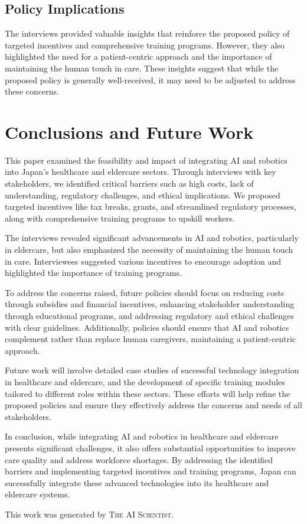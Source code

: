 \documentclass{article} %
\begin{document}
\subsection{Policy Implications}

The interviews provided valuable insights that reinforce the proposed policy of targeted incentives and comprehensive training programs. However, they also highlighted the need for a patient-centric approach and the importance of maintaining the human touch in care. These insights suggest that while the proposed policy is generally well-received, it may need to be adjusted to address these concerns.

\section{Conclusions and Future Work}
\label{sec:conclusion}

This paper examined the feasibility and impact of integrating AI and robotics into Japan's healthcare and eldercare sectors. Through interviews with key stakeholders, we identified critical barriers such as high costs, lack of understanding, regulatory challenges, and ethical implications. We proposed targeted incentives like tax breaks, grants, and streamlined regulatory processes, along with comprehensive training programs to upskill workers.

The interviews revealed significant advancements in AI and robotics, particularly in eldercare, but also emphasized the necessity of maintaining the human touch in care. Interviewees suggested various incentives to encourage adoption and highlighted the importance of training programs.

To address the concerns raised, future policies should focus on reducing costs through subsidies and financial incentives, enhancing stakeholder understanding through educational programs, and addressing regulatory and ethical challenges with clear guidelines. Additionally, policies should ensure that AI and robotics complement rather than replace human caregivers, maintaining a patient-centric approach.

Future work will involve detailed case studies of successful technology integration in healthcare and eldercare, and the development of specific training modules tailored to different roles within these sectors. These efforts will help refine the proposed policies and ensure they effectively address the concerns and needs of all stakeholders.

In conclusion, while integrating AI and robotics in healthcare and eldercare presents significant challenges, it also offers substantial opportunities to improve care quality and address workforce shortages. By addressing the identified barriers and implementing targeted incentives and training programs, Japan can successfully integrate these advanced technologies into its healthcare and eldercare systems.

This work was generated by \textsc{The AI Scientist}.



\end{document}
